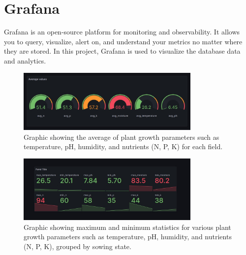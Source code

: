 \chapter{Grafana}

Grafana is an open-source platform for monitoring and observability. It allows you to query, visualize, alert on, and understand your metrics no matter where they are stored. In this project, Grafana is used to visualize the database data and analytics.



\begin{figure} [H]
    \centering
    \includegraphics[width=0.8\textwidth]{media/grafana_4.jpg}
    \caption{Graphic showing the average of plant growth parameters such as temperature, pH, humidity, and nutrients (N, P, K) for each field.}
    \label{fig:grafana}
\end{figure}


\begin{figure} [H]
    \centering
    \includegraphics[width=0.8\textwidth]{media/grafana_3.jpg}
    \caption{Graphic showing maximum and minimum statistics for various plant growth parameters such as temperature, pH, humidity, and nutrients (N, P, K), grouped by sowing state.}
    \label{fig:grafana}
\end{figure}